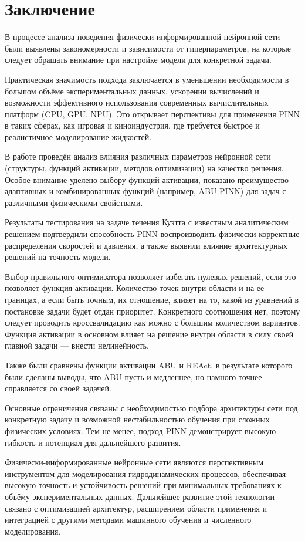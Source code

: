 \chapter{Заключение}
В процессе анализа поведения физически-информированной нейронной сети были выявлены
закономерности и зависимости от гиперпараметров, на которые следует обращать внимание
при настройке модели для конкретной задачи.

Практическая значимость подхода заключается в уменьшении необходимости в большом объёме
экспериментальных данных, ускорении вычислений и возможности эффективного использования
современных вычислительных платформ (CPU, GPU, NPU). Это открывает перспективы для применения
PINN в таких сферах, как игровая и киноиндустрия, где требуется быстрое и реалистичное
моделирование жидкостей.

В работе проведён анализ влияния различных параметров нейронной сети (структуры, функций
активации, методов оптимизации) на качество решения. Особое внимание уделено выбору
функций активации, показано преимущество адаптивных и комбинированных функций (например,
ABU-PINN) для задач с различными физическими свойствами.

Результаты тестирования на задаче течения Куэтта с известным аналитическим решением подтвердили
способность PINN воспроизводить физически корректные распределения скоростей и давления,
а также выявили влияние архитектурных решений на точность модели.

Выбор правильного оптимизатора позволяет избегать нулевых решений, если это позволяет
функция активации. Количество точек внутри области и на ее границах, а если быть точным,
их отношение, влияет на то, какой из уравнений в постановке задачи будет отдан приоритет.
Конкретного соотношения нет, поэтому следует проводить кроссвалидацию как можно с большим
количеством вариантов. Функция активации в основном влияет на решение внутри области в
силу своей главной задачи --- внести нелинейность. 

Также были сравнены функции активации ABU и REAct, в результате которого были сделаны выводы,
что ABU пусть и медленнее, но намного точнее справляется со своей задачей.

Основные ограничения связаны с необходимостью подбора архитектуры сети под конкретную задачу
и возможной нестабильностью обучения при сложных физических условиях. Тем не менее, подход PINN
демонстрирует высокую гибкость и потенциал для дальнейшего развития.

Физически-информированные нейронные сети являются перспективным инструментом для моделирования
гидродинамических процессов, обеспечивая высокую точность и устойчивость решений при минимальных
требованиях к объёму экспериментальных данных. Дальнейшее развитие этой технологии связано с
оптимизацией архитектур, расширением области применения и интеграцией с другими методами машинного
обучения и численного моделирования.